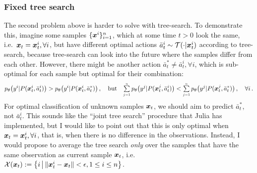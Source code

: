 \subsubsection{Fixed tree search}
The second problem above is harder to solve with tree-search.
To demonstrate this, imagine some samples $\{\bm x^i\}_{i=1}^n$,
which at some time $t > 0$ look the same, 
i.e.~$\bm x_t = \bm x^i_t, \forall i$,
but have different optimal actions 
$\bar a^i_t \sim \mathcal{T}(\cdot|\bm x^i_t)$
according to tree-search, 
because tree-search can look into the future 
where the samples differ from each other.
However, there might be another action 
$\bar a^*_t \neq \bar a^i_t, \forall i$,
which is sub-optimal for each sample but optimal for their combination:
\begin{align}
	p_\theta\big(y^i| P(\bm x^i_t, \bar a^i_t)\big) 
	> p_\theta\big(y^i| P(\bm x^i_t, \bar a^*_t)\big) \,, 
	\quad \text{but} \quad
	{\textstyle \sum\limits_{\scriptscriptstyle j=1}^{\scriptscriptstyle n}}\, p_\theta\big(y^j | P(\bm x^j_t, \bar a^i_t)\big) < 
	{\textstyle \sum\limits_{\scriptscriptstyle j=1}^{\scriptscriptstyle n}}\, p_\theta\big(y^j| P(\bm x^j_t, \bar a^*_t)\big) \,, 
	\quad	\forall i\,.
\end{align}
For optimal classification of unknown samples $\bm x_t$, 
we should aim to predict $\bar a^*_t$, not $\bar a^i_t$.
This sounds like the ``joint tree search'' procedure that Julia
has implemented, but I would like to point out that this is
only optimal when $\bm x_t = \bm x^i_t, \forall i$,
that is, when there is no difference in the observations.
Instead, I would propose to average the tree search {\em only} over
the samples that have the same observation as current sample $\bm x_t$, 
i.e.~$\mathcal{X}(\bm x_t) := \big\{ i \,\big|\, 
\|\bm x_t^i - \bm x_t \| < \epsilon, 1 \leq i \leq n\big\}$.

